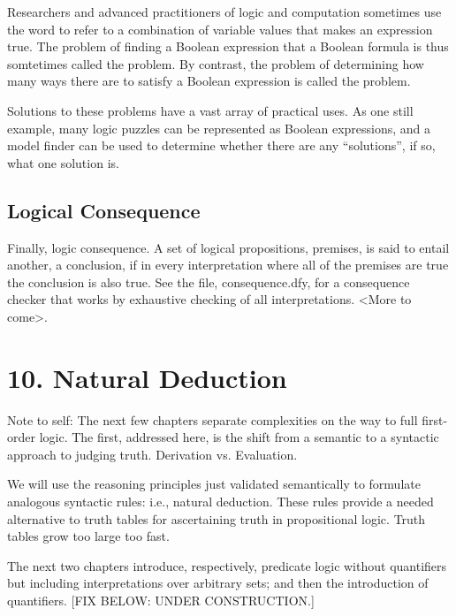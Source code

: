 \documentclass[letterpaper,10pt,english]{sphinxmanual}
\begin{document}
Researchers and advanced practitioners of logic and computation
sometimes use the word  to refer to a combination of variable
values that makes an expression true. The problem of finding a Boolean
expression that  a Boolean formula is thus somtetimes
called the  problem. By contrast, the problem of
determining how many ways there are to satisfy a Boolean expression is
called the  problem.

Solutions to these problems have a vast array of practical uses.  As
one still example, many logic puzzles can be represented as Boolean
expressions, and a model finder can be used to determine whether there
are any “solutions”, if so, what one solution is.


\section{Logical Consequence}
\label{\detokenize{09-propositional-logic:logical-consequence}}
Finally, logic consequence. A set of logical propositions, premises,
is said to entail another, a conclusion, if in every interpretation
where all of the premises are true the conclusion is also true. See
the file, consequence.dfy, for a consequence checker that works by
exhaustive checking of all interpretations. \textless{}More to come\textgreater{}.


\chapter{10. Natural Deduction}
\label{\detokenize{10-natural-deduction::doc}}\label{\detokenize{10-natural-deduction:natural-deduction}}
Note to self: The next few chapters separate complexities on the way
to full first-order logic. The first, addressed here, is the shift
from a semantic to a syntactic approach to judging truth. Derivation
vs. Evaluation.

We will use the reasoning principles just validated semantically to
formulate analogous syntactic rules: i.e., natural deduction. These
rules provide a needed alternative to truth tables for ascertaining
truth in propositional logic. Truth tables grow too large too fast.

The next two chapters introduce, respectively, predicate logic without
quantifiers but including interpretations over arbitrary sets; and then
the introduction of quantifiers.
{[}FIX BELOW: UNDER CONSTRUCTION.{]}
\end{document}
